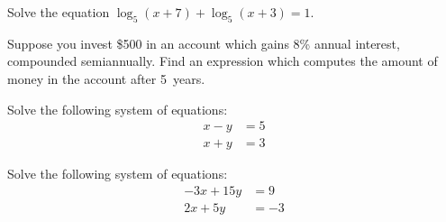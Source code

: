 \documentclass[12pt,letterpaper]{exam}
\begin{document}
\begin{questions}
\newpage
\question[5] Solve the equation $\log_5(x + 7) + \log_5(x + 3)= 1$. 





\newpage
\question[5] Suppose you invest \$500 in an account which gains 8\% annual interest, compounded semiannually. Find an expression which computes the amount of money in the account after 5~years. 





\newpage
\question[5] Solve the following system of equations:
	\[
	\begin{aligned}
	x - y&= 5 \\
	x + y&= 3
	\end{aligned}
	\]





\newpage
\question[5] Solve the following system of equations:
	\[
	\begin{aligned}
	-3x + 15y&= 9 \\
	2x + 5y&= -3
	\end{aligned}
	\]


\end{questions}
\end{document}
